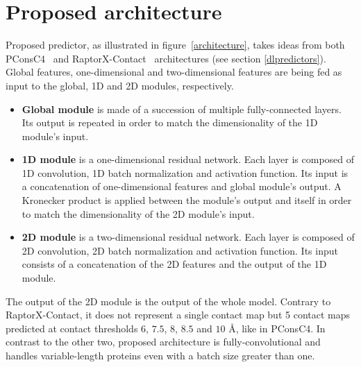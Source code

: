 \section{Proposed architecture}

  Proposed predictor, as illustrated in figure~\ref{architecture}, takes ideas from both PConsC4~\cite{Michel383133} and 
  RaptorX-Contact~\cite{RaptorX} architectures (see section \ref{dlpredictors}).
  Global features, one-dimensional and two-dimensional features are being fed
  as input to the global, 1D and 2D modules, respectively.
  \begin{itemize}
    \item \textbf{Global module} is made of a succession of multiple fully-connected layers.
        Its output is repeated in order to match the dimensionality of the 1D module's input.
    \item \textbf{1D module} is a one-dimensional residual network.
        Each layer is composed of 1D convolution, 1D batch normalization and activation function.
        Its input is a concatenation of one-dimensional features and global module's output.
        A Kronecker product is applied between the module's output and itself
        in order to match the dimensionality of the 2D module's input.
    \item \textbf{2D module} is a two-dimensional residual network.
        Each layer is composed of 2D convolution, 2D batch normalization and activation function.
        Its input consists of a concatenation of the 2D features and the output of the 1D module.
  \end{itemize}
  The output of the 2D module is the output of the whole model. Contrary to RaptorX-Contact,
  it does not represent a single contact map but 5 contact maps predicted at contact thresholds
  $6$, $7.5$, $8$, $8.5$ and $10$ \AA{}, like in PConsC4.
  In contrast to the other two, proposed architecture is fully-convolutional and handles variable-length
  proteins even with a batch size greater than one.


